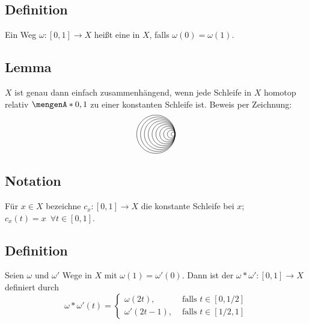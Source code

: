 \subsection[Definition: Schleife]{Definition} %
\label{sub:94}
Ein Weg $\omega : [0,1] \to X$ heißt eine  in $X$, falls $\omega(0)= \omega(1)$. 

\subsection{Lemma} %
\label{sub:95}
$X$ ist genau dann einfach zusammenhängend, wenn jede Schleife in $X$ homotop relativ $\set{0,1}$ zu einer konstanten Schleife ist.
Beweis per Zeichnung:
\[
	\begin{tikzpicture}[scale=0.8]
		\foreach \r in {0.1, 0.2,...,1}{
			\draw (0,0) arc (0:360:\r); 
		}
	\end{tikzpicture}
\]

\subsection{Notation} %
\label{sub:96}
Für $x \in X$ bezeichne $c_x : [0,1] \to X$ die konstante Schleife bei $x$; $c_x(t)= x \enspace \forall t \in [0,1]$.

\subsection[Definition: Kompositionsweg]{Definition} %
\label{sub:97}
Seien $\omega$ und $\omega'$ Wege in $X$ mit $\omega(1)= \omega'(0)$. Dann ist der  $\omega * \omega' : [0,1] \to X$ definiert durch 
\[
	\omega * \omega' (t) = \begin{cases}
		\omega(2 t), &\text{ falls }t \in [0, 1/2]\\
		\omega'(2t -1), &\text{ falls } t \in [1/2,1]
	\end{cases}
\] 
